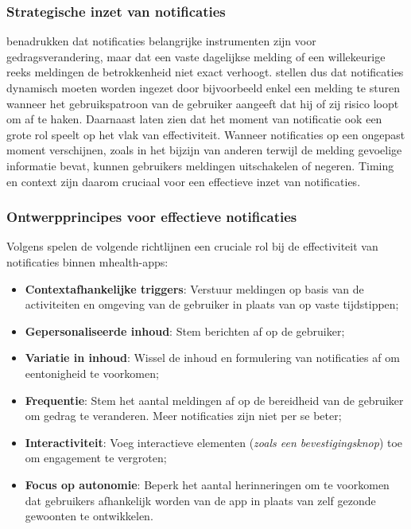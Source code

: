 \vspace{1em}

\subsubsection{Strategische inzet van notificaties}
\label{subsubsec:strategie-notificaties}

\vspace{1em}

\textcite{Bell2023} benadrukken dat notificaties belangrijke instrumenten zijn voor gedragsverandering, maar dat een vaste dagelijkse melding of een willekeurige reeks meldingen de betrokkenheid niet exact verhoogt. \textcite{Bell2023} stellen dus dat notificaties dynamisch moeten worden ingezet door bijvoorbeeld enkel een melding te sturen wanneer het gebruikspatroon van de gebruiker aangeeft dat hij of zij risico loopt om af te haken. Daarnaast laten \textcite{Szinay2020} zien dat het moment van notificatie ook een grote rol speelt op het vlak van effectiviteit. Wanneer notificaties op een ongepast moment verschijnen, zoals in het bijzijn van anderen terwijl de melding gevoelige informatie bevat, kunnen gebruikers meldingen uitschakelen of negeren. Timing en context zijn daarom cruciaal voor een effectieve inzet van notificaties.

\vspace{1em}

\subsubsection{Ontwerpprincipes voor effectieve notificaties}
\label{subsubsec:ontwerp-notificaties}

\vspace{1em}

Volgens \textcite{Woodward2021} spelen de volgende richtlijnen een cruciale rol bij de effectiviteit van notificaties binnen \acrshort{mhealth}-apps:

\begin{itemize}
    \item \textbf{Contextafhankelijke triggers}: Verstuur meldingen op basis van de activiteiten en omgeving van de gebruiker in plaats van op vaste tijdstippen;
    \item \textbf{Gepersonaliseerde inhoud}: Stem berichten af op de gebruiker;
    \item \textbf{Variatie in inhoud}: Wissel de inhoud en formulering van notificaties af om eentonigheid te voorkomen;
    \item \textbf{Frequentie}: Stem het aantal meldingen af op de bereidheid van de gebruiker om gedrag te veranderen. Meer notificaties zijn niet per se beter;
    \item \textbf{Interactiviteit}: Voeg interactieve elementen (\textit{zoals een bevestigingsknop}) toe om engagement te vergroten;
    \item \textbf{Focus op autonomie}: Beperk het aantal herinneringen om te voorkomen dat gebruikers afhankelijk worden van de app in plaats van zelf gezonde gewoonten te ontwikkelen.
\end{itemize}

